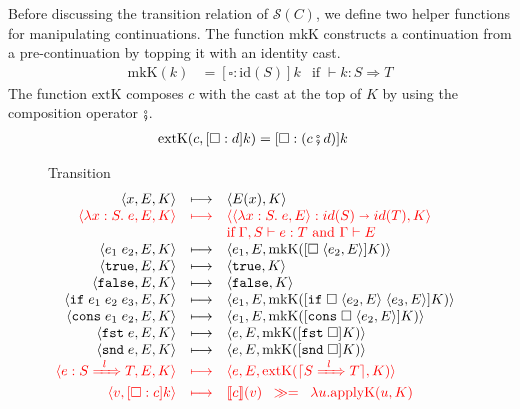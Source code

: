 \documentclass[runningheads]{llncs}
\newcommand{\highlight}[1]{{\color{red} #1}}
\newcommand{\sidecond}[1]{\text{if}\;#1}
\newcommand{\figreduceto}[3]{#1 & \longmapsto & #2 & #3 \\}
\newcommand{\figreducetoH}[3]{\highlight{#1} & \highlight{\longmapsto} & 
\highlight{#2} & \highlight{#3} \\}
\newcommand{\SMachine}[1]{\ensuremath{\mathcal{S}(#1)}}
\newcommand{\Pfunc}[2]{\ensuremath{#1 \shortrightarrow #2}}
\newcommand{\evar}[1]{#1}
\newcommand{\elam}[3]{\lambda#1:#2.\;#3}
\newcommand{\eapp}[2]{#1\;#2}
\newcommand{\etrue}[0]{\mathtt{true}}
\newcommand{\efalse}[0]{\mathtt{false}}
\newcommand{\eif}[3]{\mathtt{if}\;#1\;#2\;#3}
\newcommand{\econs}[2]{\mathtt{cons} \; #1 \; #2}
\newcommand{\efst}[1]{\mathtt{fst} \; #1}
\newcommand{\esnd}[1]{\mathtt{snd} \; #1}
\newcommand{\ecast}[2]{\ensuremath{#1 : #2}}
\newcommand{\ccast}[3]{#1 \xRightarrow[]{\enskip #2 \enskip} #3}
\newcommand{\vtrue}[0]{\mathtt{true}}
\newcommand{\vfalse}[0]{\mathtt{false}}
\newcommand{\vfunc}[4]{\langle\elam{#1}{#2}{#3},#4\rangle}
\newcommand{\sexpr}[3]{\ensuremath{\langle#1,#2,#3\rangle}}
\newcommand{\scont}[2]{\ensuremath{\langle#1,#2\rangle}}
\newcommand{\Kcons}[2]{[#1]#2}
\newcommand{\closure}[2]{\langle#1,#2\rangle}
\newcommand{\FappXO}[2]{\eapp{\square}{\closure{#1}{#2}}}
\newcommand{\Fif}[3]{\eif{\square}{\closure{#1}{#3}}{\closure{#2}{#3}}}
\newcommand{\FconsXO}[2]{\econs{\square}{\closure{#1}{#2}}}
\newcommand{\Ffst}[0]{\efst{\square}}
\newcommand{\Fsnd}[0]{\esnd{\square}}
\newcommand{\Fcast}[1]{\ecast{\square}{#1}}
\newcommand{\mbind}[0]{\ensuremath{\;\gg=\;}}
\newcommand{\denote}[1]{\ensuremath{\llbracket #1 \rrbracket}}
\newcommand{\compose}[2]{\ensuremath{#1 \fatsemi #2}}
\newcommand{\translate}[1]{\ensuremath{\lceil#1\rceil}}
\newcommand{\id}[1]{\ensuremath{\mathrm{id}(#1)}}
\newcommand{\mkContName}[0]{\ensuremath{\mathrm{mkK}}}
\newcommand{\mkCont}[1]{\ensuremath{\mkContName(#1)}}
\newcommand{\extContName}[0]{\ensuremath{\mathrm{extK}}}
\newcommand{\extCont}[2]{\ensuremath{\extContName(#1,#2)}}
\newcommand{\applyContName}[0]{\ensuremath{\mathrm{applyK}}}
\newcommand{\applyCont}[2]{\ensuremath{\applyContName(#1,#2)}}
\newcommand{\expressiontyping}[3]{\ensuremath{#1 \vdash #2 : #3}}
\newcommand{\casttyping}[3]{\ensuremath{\vdash #1 : #2 \Longrightarrow #3}}
\newcommand{\reducetoS}[3]{\ensuremath{#2 \longmapsto_{\SMachine{#1}} #3}}
\begin{document}
Before discussing the transition relation of \SMachine{C}, we define
two helper functions for manipulating continuations.
%
The function $\mkContName$ constructs a continuation from a
pre-continuation by topping it with an identity cast.
\begin{align*}
  \mkCont{k} &= \Kcons{\Fcast{\id{S}}}{k} & \sidecond{\casttyping{k}{S}{T}}
\end{align*}
The function $\extContName$ composes $c$ with the cast at the top of
$K$ by using the composition operator $\fatsemi$.
\begin{align*}
  \extCont{c}{\Kcons{\Fcast{d}}{k}} &= \Kcons{\Fcast{(\compose{c}{d})}}{k}
\end{align*}

\begin{figure}[tp]
	\fbox{\reducetoS{C}{s}{s}} Transition
	\[
	\begin{array}{rclr}
	\figreduceto{\sexpr{\evar{x}}{E}{K}}{\scont{E(x)}{K}}{}
	\figreducetoH{
		\sexpr{\elam{x}{S}{e}}{E}{K}
	}{
		\scont{\ecast{\vfunc{x}{S}{e}{E}}{\Pfunc{id(S)}{id(T)}}}{K}
	}{}
	& &
	\highlight{
	\sidecond{
		\expressiontyping{\Gamma,S}{e}{T}
		\text{ and }
		\Gamma \vdash E}
	}
	\\
	\figreduceto{\sexpr{\eapp{e_1}{e_2}}{E}{K}}{
		\sexpr{e_1}{E}{\mkCont{\Kcons{\FappXO{e_2}{E}}{K}}}
	}{}
	\figreduceto{\sexpr{\etrue}{E}{K}}{\scont{\vtrue}{K}}{}
	\figreduceto{\sexpr{\efalse}{E}{K}}{\scont{\vfalse}{K}}{}
	\figreduceto{\sexpr{\eif{e_1}{e_2}{e_3}}{E}{K}}{
		\sexpr{e_1}{E}{\mkCont{\Kcons{\Fif{e_2}{e_3}{E}}{K}}}
	}{}
	\figreduceto{\sexpr{\econs{e_1}{e_2}}{E}{K}}{
		\sexpr{e_1}{E}{\mkCont{\Kcons{\FconsXO{e_2}{E}}{K}}}
	}{}
	\figreduceto{\sexpr{\efst{e}}{E}{K}}{
		\sexpr{e}{E}{\mkCont{\Kcons{\Ffst}{K}}}
	}{}
	\figreduceto{\sexpr{\esnd{e}}{E}{K}}{
		\sexpr{e}{E}{\mkCont{\Kcons{\Fsnd}{K}}}
	}{}
	\figreducetoH{
		\sexpr{\ecast{e}{\ccast{S}{l}{T}}}{E}{K}
	}{
		\sexpr{e}{E}{\extCont{\translate{\ccast{S}{l}{T}}}{K}}
	}{}
	\figreducetoH{\scont{v}{\Kcons{\Fcast{c}}{k}}}{
		\denote{c}(v) \; \mbind \; \lambda u. \applyCont{u}{K}
	}{}
	\end{array}
	\]
	

\end{figure}
\end{document}

